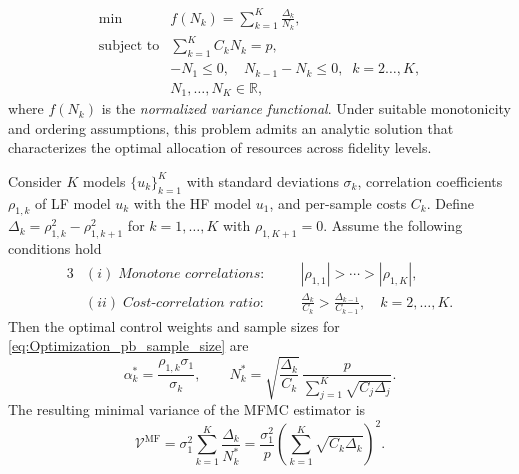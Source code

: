%
\begin{equation}\label{eq:Optimization_pb_sample_size_reduced}
    \begin{array}{ll}
    \min &\displaystyle f(N_k) =\sum_{k=1}^K \frac{\Delta_k}{N_k},\\
       \text{subject to} &\displaystyle\sum\limits_{k=1}^K C_kN_k=p,\\[2pt]
       &\displaystyle -N_1\le 0,\quad \displaystyle N_{k-1}-N_k\le 0, \;\; k=2\ldots,K,\\
       &N_1,\ldots, N_K\in \mathbb{R},
    \end{array}
\end{equation}
%
where $f(N_k)$ is the {\it normalized variance functional}. Under suitable monotonicity and ordering assumptions, this problem admits an analytic solution that characterizes the optimal allocation of resources across fidelity levels.


%
\begin{theorem}\label{thm:Sample_size_est}
Consider $K$ models $\{u_{k}\}_{k=1}^K$ with standard deviations $\sigma_k$, correlation coefficients $\rho_{1,k}$ of LF model $u_k$ with the HF model $u_1$, and per-sample costs $C_k$. Define $\Delta_k = \rho_{1,k}^2 - \rho_{1,k+1}^2$ for $k = 1, \dots, K$ with $\rho_{1,K+1}=0$. Assume the following conditions hold
%
\begin{alignat*}{3}
&(i)\;\textit{Monotone correlations:} &\quad& |\rho_{1,1}| > \cdots > |\rho_{1,K}|,\\
&(ii)\;\textit{Cost-correlation ratio:} &\quad& \frac{\Delta_{k}}{C_k} > \frac{\Delta_{k-1}}{C_{k-1}}, \quad k=2,\ldots,K.
\end{alignat*}
%
Then the optimal control weights and sample sizes for \eqref{eq:Optimization_pb_sample_size} are
%
\begin{equation}\label{eq:MFMC_RealValued_Sample_Size}
    \alpha_k^* = \frac{\rho_{1,k}\sigma_1}{\sigma_k}, \qquad
    N_k^* = \sqrt{\frac{\Delta_k}{C_k}}\,
    \frac{p}{\sum_{j=1}^K \sqrt{C_j \Delta_j}}.
\end{equation}
%
%
The resulting minimal variance of the MFMC estimator is
\begin{equation}\label{eq:MFMC_variance_optimal}
\mathcal{V}^{\text{MF}}
= \sigma_1^2\sum_{k=1}^K \frac{\Delta_k}{N_k^*}=\frac{\sigma_1^2}{p}\!\left(\sum_{k=1}^K \sqrt{C_k \Delta_k}\right)^{\!2}.
\end{equation}
\end{theorem}
%


